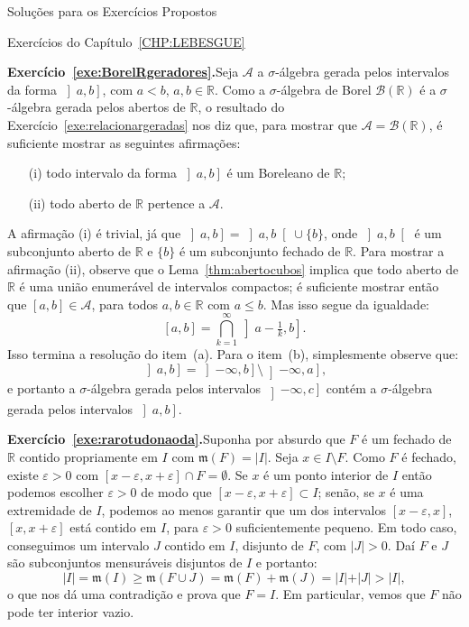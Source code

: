 \documentclass[oneside,final,11pt]{amsbook}
\newcommand{\R}{\mathds R}
\newcommand{\leb}{\mathfrak m}
\newcommand{\Borel}{\mathcal B}
\theoremstyle{remark}\newtheorem{exercise}{Exercício}[chapter]
\theoremstyle{remark}\newtheorem{*exercise}[exercise]{\hbox to 0pt{\hskip 0pt minus 1fil*}Exercício}
\theoremstyle{definition}\newtheorem{exdefin}{Definição}[chapter]
\theoremstyle{plain}\newtheorem{teo}{Teorema}[section]
\theoremstyle{plain}\newtheorem{lem}[teo]{Lema}
\theoremstyle{plain}\newtheorem{prop}[teo]{Proposição}
\theoremstyle{plain}\newtheorem{cor}[teo]{Corolário}
\theoremstyle{definition}\newtheorem{defin}[teo]{Definição}
\theoremstyle{remark}\newtheorem{rem}[teo]{Observação}
\theoremstyle{definition}\newtheorem{notation}[teo]{Notação}
\theoremstyle{definition}\newtheorem{convention}[teo]{Convenção}
\theoremstyle{definition}\newtheorem{example}[teo]{Exemplo}
\numberwithin{section}{chapter}
\numberwithin{equation}{section}
\begin{document}
\begin{chapter}{Soluções para os Exercícios Propostos}
\begin{section}{Exercícios do Capítulo~\ref{CHP:LEBESGUE}}
\medskip

\textbf{Exercício~\ref{exe:BorelRgeradores}.}\enspace Seja $\mathcal A$ a $\sigma$-álgebra
gerada pelos intervalos da forma $\left]a,b\right]$, com $a<b$, $a,b\in\R$. Como a $\sigma$-álgebra de
Borel $\Borel(\R)$ é a $\sigma$-álgebra gerada pelos abertos de $\R$, o resultado do Exercício~\ref{exe:relacionargeradas}
nos diz que, para mostrar que $\mathcal A=\Borel(\R)$, é suficiente mostrar as seguintes afirmações:
\begin{itemize}
\item[(i)] todo intervalo da forma $\left]a,b\right]$ é um Boreleano de $\R$;
\item[(ii)] todo aberto de $\R$ pertence a $\mathcal A$.
\end{itemize}
A afirmação (i) é trivial, já que $\left]a,b\right]=\left]a,b\right[\cup\{b\}$,
onde $\left]a,b\right[$ é um subconjunto aberto de $\R$ e $\{b\}$ é um subconjunto fechado de $\R$.
Para mostrar a afirmação (ii), observe que o Lema~\ref{thm:abertocubos} implica que todo aberto
de $\R$ é uma união enumerável de intervalos compactos; é suficiente mostrar então que
$[a,b]\in\mathcal A$, para todos $a,b\in\R$ com $a\le b$. Mas isso segue
da igualdade:
\[[a,b]=\bigcap_{k=1}^\infty\left]a-\tfrac1k,b\right].\]
Isso termina a resolução do item~(a). Para o item~(b), simplesmente observe que:
\[\left]a,b\right]=\left]-\infty,b\right]\setminus\left]-\infty,a\right],\]
e portanto a $\sigma$-álgebra gerada pelos intervalos $\left]-\infty,c\right]$ contém
a $\sigma$-álgebra gerada pelos intervalos $\left]a,b\right]$.

\medskip

\textbf{Exercício~\ref{exe:rarotudonaoda}.}\enspace Suponha por absurdo que $F$ é um fechado
de $\R$ contido propriamente em $I$ com $\leb(F)=\vert I\vert$. Seja $x\in I\setminus F$.
Como $F$ é fechado, existe $\varepsilon>0$ com $[x-\varepsilon,x+\varepsilon]\cap F=\emptyset$.
Se $x$ é um ponto interior de $I$ então podemos escolher $\varepsilon>0$ de modo que
$[x-\varepsilon,x+\varepsilon]\subset I$; senão, se $x$ é uma extremidade de $I$,
podemos ao menos garantir que um dos intervalos $[x-\varepsilon,x]$, $[x,x+\varepsilon]$
está contido em $I$, para $\varepsilon>0$ suficientemente pequeno. Em todo caso,
conseguimos um intervalo $J$ contido em $I$, disjunto de $F$, com $\vert J\vert>0$.
Daí $F$ e $J$ são subconjuntos mensuráveis disjuntos de $I$ e portanto:
\[\vert I\vert=\leb(I)\ge\leb(F\cup J)=\leb(F)+\leb(J)=\vert I\vert+\vert J\vert>\vert I\vert,\]
o que nos dá uma contradição e prova que $F=I$. Em particular, vemos que $F$ não pode ter interior vazio.


\end{section}
\end{chapter}
\end{document}
